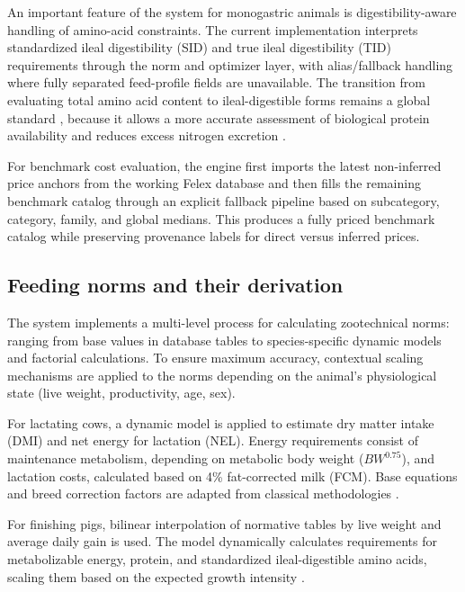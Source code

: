 \documentclass[a4paper,fleqn]{cas-sc}
\begin{document}
An important feature of the system for monogastric animals is digestibility-aware handling of amino-acid constraints. The current implementation interprets standardized ileal digestibility (SID) and true ileal digestibility (TID) requirements through the norm and optimizer layer, with alias/fallback handling where fully separated feed-profile fields are unavailable. The transition from evaluating total amino acid content to ileal-digestible forms remains a global standard \citep{stein2007, nRC2012, nRC1994}, because it allows a more accurate assessment of biological protein availability and reduces excess nitrogen excretion \citep{pomar2021, deLange2012, vanmilgen2015}.

For benchmark cost evaluation, the engine first imports the latest non-inferred price anchors from the working Felex database and then fills the remaining benchmark catalog through an explicit fallback pipeline based on subcategory, category, family, and global medians. This produces a fully priced benchmark catalog while preserving provenance labels for direct versus inferred prices.

\subsection{Feeding norms and their derivation}\label{subsec:norms}

The system implements a multi-level process for calculating zootechnical norms: ranging from base values in database tables to species-specific dynamic models and factorial calculations. To ensure maximum accuracy, contextual scaling mechanisms are applied to the norms depending on the animal's physiological state (live weight, productivity, age, sex).

For lactating cows, a dynamic model is applied to estimate dry matter intake (DMI) and net energy for lactation (NEL). Energy requirements consist of maintenance metabolism, depending on metabolic body weight ($BW^{0.75}$), and lactation costs, calculated based on 4\% fat-corrected milk (FCM). Base equations and breed correction factors are adapted from classical methodologies \citep{nRC2001, kalashnikov2003}.

For finishing pigs, bilinear interpolation of normative tables by live weight and average daily gain is used. The model dynamically calculates requirements for metabolizable energy, protein, and standardized ileal-digestible amino acids, scaling them based on the expected growth intensity \citep{nRC2012}.
\end{document}
